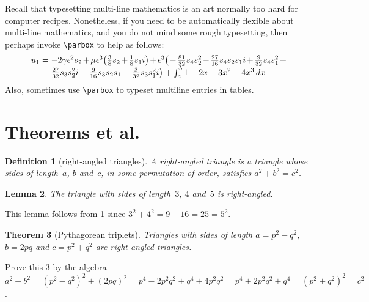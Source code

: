 \documentclass[20pt,a4paper]{extarticle}
\newtheorem{theorem}{Theorem}
\newtheorem{lemma}[theorem]{Lemma}
\newtheorem{definition}[theorem]{Definition}
\begin{document}
Recall that typesetting multi-line mathematics is an art normally too hard for computer recipes.  Nonetheless, if you need to be automatically flexible about multi-line mathematics, and you do not mind some rough typesetting, then perhaps invoke \verb|\parbox| to help as follows: 
\newcommand{\parmath}[2][0.8\linewidth]{\parbox[t]{#1}%
    {\raggedright\linespread{1.2}\selectfont\(#2\)}}
\[
u_1=\parmath{ -2 \gamma  \epsilon^{2} s_{2}+\mu  \epsilon^{3} \big( \frac{3}{8} s_{2}+\frac{1}{8} s_{1} i\big)+\epsilon^{3} \big( -\frac{81}{32} s_{4} s_{2}^{2}-\frac{27}{16} s_{4} s_{2} s_{1} i+\frac{9}{32} s_{4} s_{1}^{2}+\frac{27}{32} s_{3} s_{2}^{2} i-\frac{9}{16} s_{3} s_{2} s_{1}-\frac{3}{32} s_{3} s_{1}^{2} i\big) +\int_a^b 1-2x+3x^2-4x^3\,dx }
\]
Also, sometimes use \verb|\parbox| to typeset multiline entries in tables.


\section{Theorems et al.}


\begin{definition}[right-angled triangles] \label{def:tri}
A \emph{right-angled triangle} is a triangle whose sides of length~\(a\), \(b\) and~\(c\), in some permutation of order, satisfies \(a^2+b^2=c^2\).
\end{definition}

\begin{lemma} 
The triangle with sides of length~\(3\), \(4\) and~\(5\) is right-angled.
\end{lemma}

This lemma follows from \cref{def:tri} since \(3^2+4^2=9+16=25=5^2\).

\begin{theorem}[Pythagorean triplets] \label{thm:py}
Triangles with sides of length \(a=p^2-q^2\), \(b=2pq\) and \(c=p^2+q^2\) are right-angled triangles.
\end{theorem}

Prove this \cref{thm:py} by the algebra \(a^2+b^2 =(p^2-q^2)^2+(2pq)^2
=p^4-2p^2q^2+q^4+4p^2q^2
=p^4+2p^2q^2+q^4
=(p^2+q^2)^2 =c^2\).
\end{document}
